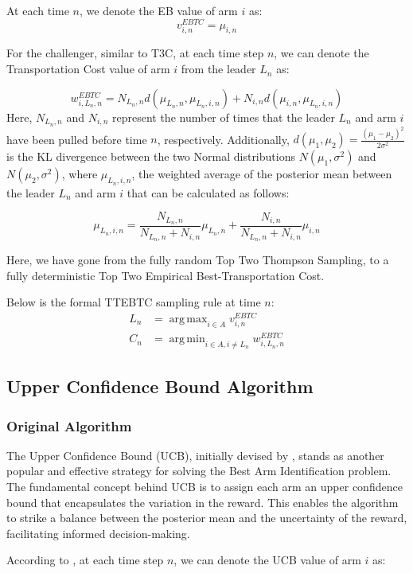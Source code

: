 \documentclass[a4paper, 12pt]{article}
\DeclareMathOperator{\argmax}{arg\,max}
\DeclareMathOperator{\argmin}{arg\,min}
\theoremstyle{definition}
\begin{document}
At each time $n$, we denote the EB value of arm $i$ as:
\[
v_{i,n}^{EBTC} = \mu_{i,n}   
\]

For the challenger, similar to T3C, at each time step $n$, we can denote the Transportation Cost value of arm $i$ from the leader $L_n$ as:

\[
w_{i,L_n,n}^{EBTC} = N_{L_n,n} d(\mu_{L_n,n},\mu_{L_n,i,n})+ N_{i,n} d(\mu_{i,n},\mu_{L_n,i,n})     
\]
Here, $N_{L_n,n}$ and $N_{i,n}$ represent the number of times that the leader $L_n$ and arm $i$ have been pulled before time $n$, respectively. Additionally, $d(\mu_1,\mu_2) = \frac{(\mu_1 - \mu_2)^2}{2\sigma^2}$ is the KL divergence between the two Normal distributions $N(\mu_1,\sigma^2)$ and $N(\mu_2,\sigma^2)$, where $\mu_{L_n,i,n}$, the weighted average of the posterior mean between the leader $L_n$ and arm $i$ that can be calculated as follows:

\[
\mu_{L_n,i,n} = \frac{N_{L_n,n}}{N_{L_n,n}+N_{i,n}} \mu_{L_n,n} + \frac{N_{i,n}}{N_{L_n,n}+N_{i,n}} \mu_{i,n}  
\]

Here, we have gone from the fully random Top Two Thompson Sampling, to a fully deterministic Top Two Empirical Best-Transportation Cost.

Below is the formal TTEBTC sampling rule at time $n$:
\begin{align} \label{eq:ttebtc}
L_n & = \argmax_{i\in A} v_{i,n}^{EBTC} \nonumber \\
C_n & = \argmin_{i\in A,i\neq L_n} w_{i,L_n,n}^{EBTC}
\end{align}


\subsection{Upper Confidence Bound Algorithm}
\subsubsection{Original Algorithm}
The Upper Confidence Bound (UCB), initially devised by \cite{ucb}, stands as another popular and effective strategy for solving the Best Arm Identification problem. The fundamental concept behind UCB is to assign each arm an upper confidence bound that encapsulates the variation in the reward. This enables the algorithm to strike a balance between the posterior mean and the uncertainty of the reward, facilitating informed decision-making.

According to \cite{ttucb}, at each time step $n$, we can denote the UCB value of arm $i$ as:
\end{document}
